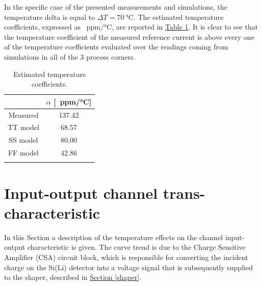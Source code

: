 \noindent
In the specific case of the presented measurements and simulations, the temperature delta is equal to $\Delta T = \SI{70}{\celsius}$. The estimated temperature coefficients, expressed as \SI{}{ppm/\celsius}, are reported in \hyperref[tabtempcoefficients]{Table \ref{tabtempcoefficients}}. It is clear to see that the temperature coefficient of the measured reference current is above every one of the temperature coefficients evaluated over the readings coming from simulations in all of the 3 process corners. %

\begin{table}[ht]
    \centering
    \begin{tabular}{c c} 
        \Xhline{2\arrayrulewidth}
        & $\alpha$ [\SI{}{ppm/\celsius}] \T\B \\
        \hline
        Measured & 137.42 \T\B \\
        TT model & 68.57 \T\B \\
        SS model & 80.00 \T\B \\
        FF model & 42.86 \T\B \\
        \Xhline{2\arrayrulewidth}
    \end{tabular}
    \caption{Estimated temperature coefficients.}
    \label{tabtempcoefficients}
\end{table}



\section{Input-output channel trans-characteristic}
\label{testboardFDT}

In this Section a description of the temperature effects on the channel input-output characteristic is given. The curve trend is due to the Charge Sensitive Amplifier (CSA) circuit block, which is responsible for converting the incident charge on the Si(Li) detector into a voltage signal that is subsequently supplied to the shaper, described in \hyperref[shaper]{Section \ref{shaper}}. 

